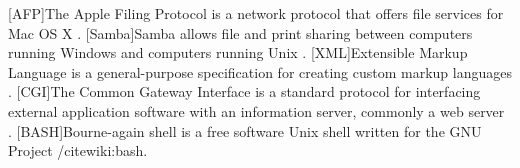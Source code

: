 \documentclass[a4paper,10pt,twoside,headings=small,bibliography=totocnumbered,headsepline]{scrartcl}
\begin{document}
\begin{appendix}
\begin{acronym}
[AFP]{The Apple Filing Protocol is a network protocol that offers file services for Mac OS X \cite{wiki:afp}.}
[Samba]{Samba allows file and print sharing between computers running Windows and computers running Unix \cite{wiki:samba}.}
[XML]{Extensible Markup Language is a general-purpose specification for creating custom markup languages \cite{wiki:xml}.}
[CGI]{The Common Gateway Interface is a standard protocol for interfacing external application software with an information server, commonly a web server \cite{wiki:cgi}.}
[BASH]{Bourne-again shell is a free software Unix shell written for the GNU Project /cite{wiki:bash}.}
\end{acronym}

\end{appendix}
\end{document}
